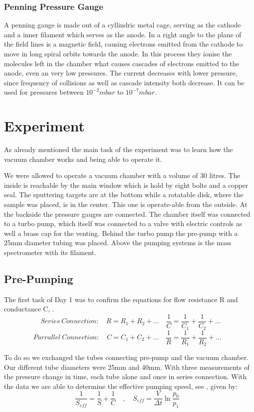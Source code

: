 \documentclass[]{article}
\begin{document}
\subsubsection[Penning]{Penning Pressure Gauge}
A penning gauge is made out of a cyllindric metal cage, serving as the cathode and a inner filament which serves as the anode. In a right angle to the plane of the field lines is a magnetic field, causing electrons emitted from the cathode to move in long spiral orbits towards the anode. In this process they ionise the molecules left in the chamber what causes cascades of electrons emitted to the anode, even an very low pressures. The current decreases with lower pressure, since frequency of collisions as well as cascade intensity both decrease. It can be used for pressures between $10^{-2}mbar$ to $10^{-7}mbar$.





\newpage
\section{Experiment}
As already mentioned the main task of the experiment was to learn how the vacuum chamber works and being able to operate it. 

We were allowed to operate a vacuum chamber with a volume of 30 litres. The inside is reachable by the main window which is hold by eight bolts and a copper seal. The sputtering targets are at the bottom while a rotatable disk, where the sample was placed, is in the center. This one is operate-able from the outside. At the backside the pressure gauges are connected. 
The chamber itself was connected to a turbo pump, which itself was connected to a valve with electric controls as well a brass cap for the venting. Behind the turbo pump the pre-pump with a 25mm diameter tubing was placed. Above the pumping systems is the mass spectrometer with its filament.

\subsection{Pre-Pumping}
The first task of Day 1 was to confirm the equations for flow resistance R and conductance C, \cite[Page 91]{VacuumHandbook}. 
\[ \quad Series \: Connection: \quad
R = R_1 + R_2 + ...  \quad \frac{1}{C} = \frac{1}{C_1} + \frac{1}{C_2} + ... \]
\[ Parrallel \: Connection: \quad
C = C_1 + C_2 + ...  \quad \frac{1}{R} = \frac{1}{R_1} + \frac{1}{R_2} + ... \]

To do so we exchanged the tubes connecting pre-pump and the vacuum chamber. Our different tube diameters were 25mm and 40mm. With three measurements of the pressure change in time, each tube alone and once in series connection. With the data we are able to determine the effective pumping speed, see \cite[Page 93]{VacuumHandbook}, given by:
\[ \frac{1}{S_{eff}} = \frac{1}{S} + \frac{1}{C} \quad , \quad
S_{eff} = \frac{V}{\Delta t} \ln{ \frac{p_0}{p_1} } \]
\end{document}
